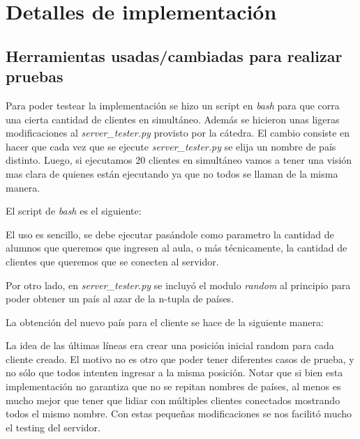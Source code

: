 \section{Detalles de implementaci\'on}
\label{sec:Imp}

\subsection{Herramientas usadas/cambiadas para realizar pruebas}
Para poder testear la implementaci\'on se hizo un script en \emph{bash} para que corra una cierta cantidad de clientes en simult\'aneo. Adem\'as se hicieron unas ligeras modificaciones al \emph{server\_tester.py} provisto por la c\'atedra. El cambio consiste en hacer que cada vez que se ejecute \emph{server\_tester.py} se elija un nombre de pa\'is distinto. Luego, si ejecutamos 20 clientes en simult\'aneo vamos a tener una visi\'on mas clara de quienes est\'an ejecutando ya que no todos se llaman de la misma manera.

El script de \emph{bash} es el siguiente:


 
 El uso es sencillo, se debe ejecutar pas\'andole como parametro la cantidad de alumnos que queremos que ingresen al aula, o m\'as t\'ecnicamente, la cantidad de clientes que queremos que se conecten al servidor.
 
Por otro lado, en \emph{server\_tester.py} se incluy\'o el modulo \emph{random} al principio para poder obtener un pa\'is al azar de la n-tupla de pa\'ises.
  


La obtenci\'on del nuevo pa\'is para el cliente se hace de la siguiente manera:


La idea de las \'ultimas l\'ineas era crear una posici\'on inicial random para cada cliente creado. El motivo no es otro que poder tener diferentes casos de prueba, y no s\'olo que todos intenten ingresar a la misma posici\'on. Notar que si bien esta implementaci\'on no garantiza que no se repitan nombres de pa\'ises, al menos es mucho mejor que tener que lidiar con m\'ultiples clientes conectados mostrando todos el mismo nombre. Con estas peque\~nas modificaciones se nos facilit\'o mucho el testing del servidor.
